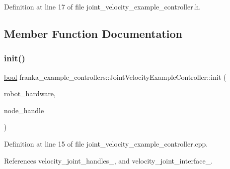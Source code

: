 Definition at line 17 of file joint\+\_\+velocity\+\_\+example\+\_\+controller.\+h.



\subsection{Member Function Documentation}
\mbox{\label{classfranka__example__controllers_1_1JointVelocityExampleController_a97f6b9f2bd26bdb3700844549a5a803c}} 
\subsubsection{\texorpdfstring{init()}{init()}}
{\footnotesize\ttfamily \hyperlink{classbool}{bool} franka\+\_\+example\+\_\+controllers\+::\+Joint\+Velocity\+Example\+Controller\+::init (\begin{DoxyParamCaption}\item[{hardware\+\_\+interface\+::\+Robot\+HW $\ast$}]{robot\+\_\+hardware,  }\item[{ros\+::\+Node\+Handle \&}]{node\+\_\+handle }\end{DoxyParamCaption})\hspace{0.3cm}{\ttfamily [override]}}



Definition at line 15 of file joint\+\_\+velocity\+\_\+example\+\_\+controller.\+cpp.



References velocity\+\_\+joint\+\_\+handles\+\_\+, and velocity\+\_\+joint\+\_\+interface\+\_\+.


